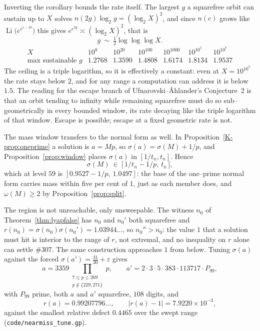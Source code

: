 \documentclass[11pt]{article}
\theoremstyle{definition}
\begin{document}
Inverting the corollary bounds the rate itself. The largest $g$ a squarefree orbit can sustain up to
$X$ solves $n(2g)\log_2g=(\log_2X)^2$, and since $n(c)$ grows like
$\operatorname{Li}\bigl(e^{e^{c-M}}\bigr)$ this gives $e^{e^{2g}}\asymp(\log_2X)^2$, that is
\[ g\ \sim\ \tfrac12\log\log\log X . \]
\[
\begin{array}{l|cccccc}
X & 10^{8} & 10^{20} & 10^{100} & 10^{1000} & 10^{10^{5}} & 10^{10^{7}}\\\hline
\text{max sustainable }g & 1.2768 & 1.3590 & 1.4808 & 1.6174 & 1.8134 & 1.9537
\end{array}
\]
The ceiling is a triple logarithm, so it is effectively a constant: even at $X=10^{10^{7}}$ the rate
stays below $2$, and for any range a computation can address it is below $1.5$. The reading for the
escape branch of Ufnarovski--\AA hlander's Conjecture~2 is that an orbit tending to infinity while
remaining squarefree must do so sub--geometrically in every bounded window, its rate decaying like
the triple logarithm of that window. Escape is possible; escape at a fixed geometric rate is not.

The mass window transfers to the normal form as well. In Proposition~\ref{K-prop:oneprime} a solution
is $a=Mp$, so $\sigma(a)=\sigma(M)+1/p$, and Proposition~\ref{prop:window} places $\sigma(a)$ in
$[1/t_n,t_n]$. Hence
\[ \sigma(M)\ \in\ \bigl[\,1/t_n-1/p,\ t_n\,\bigr], \]
which at level $59$ is $[0.9527-1/p,\ 1.0497]$: the base of the one--prime normal form carries mass
within five per cent of $1$, just as each member does, and $\omega(M)\ge2$ by
Proposition~\ref{prop:split}.

The region is not unreachable, only unsweepable. The witness $n_0$ of
Theorem~\ref{thm:lyapfalse} has $n_0$ and $n_0'$ both squarefree and
$r(n_0)=\sigma(n_0)\sigma(n_0')=1.03944\ldots$, so $n_0''>n_0$: the value $1$ that a solution must
hit is interior to the range of $r$, not extremal, and no inequality on $r$ alone can settle \#307.
The same construction approaches $1$ from below. Tuning $\sigma(a)$ against the forced
$\sigma(a')=\tfrac{31}{30}+\varepsilon$ gives
\[ a=3359\!\!\prod_{\substack{7\le p\le269\\p\notin\{229,271\}}}\!\!p,\qquad
   a'=2\cdot3\cdot5\cdot383\cdot113717\cdot P_{99}, \]
with $P_{99}$ prime, both $a$ and $a'$ squarefree, $108$ digits, and
\[ r(a)=0.99207796\ldots,\qquad |r(a)-1|=7.9220\times10^{-3}, \]
against the smallest relative defect $0.4465$ over the swept range
\textup{(\texttt{code/nearmiss\_tune.gp})}.
\end{document}
